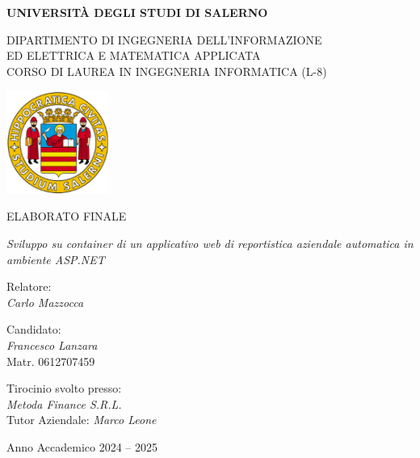 

\begin{center}
		\textbf{\Large{UNIVERSITÀ DEGLI STUDI DI SALERNO}}

	\vspace{0.5cm}
	\large DIPARTIMENTO DI INGEGNERIA DELL'INFORMAZIONE \\
	ED ELETTRICA E MATEMATICA APPLICATA \\
	\vspace{0.2cm}
	CORSO DI LAUREA IN INGEGNERIA INFORMATICA (L-8)
	\vspace{1cm}

	\includegraphics[width=0.25\textwidth]{fig/Logo_Unisa.png}
	\vspace{1cm}

	\large ELABORATO FINALE
	\vspace{0.5cm}

	\emph{\LARGE Sviluppo su container di un applicativo web di reportistica aziendale automatica in ambiente ASP.NET}
	\vspace{1.5cm}
\end{center}

\noindent
\begin{minipage}[t]{0.45\textwidth}
	Relatore: \\
	\emph{Carlo Mazzocca}
\end{minipage}
\hfill
\begin{minipage}[t]{0.45\textwidth}
	Candidato: \\
	\emph{Francesco Lanzara} \\
	Matr. 0612707459
\end{minipage}

\vspace{0.8cm}
\noindent
Tirocinio svolto presso: \\
\emph{Metoda Finance S.R.L.} \\
Tutor Aziendale: \emph{Marco Leone}

\vspace{4cm}
\begin{center}
	Anno Accademico 2024 -- 2025
\end{center}